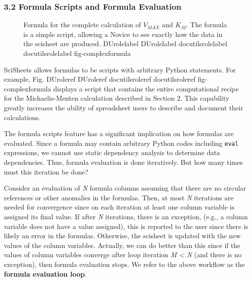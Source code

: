 \documentclass[letterpaper,compsoc,twoside]{IEEEtran}
\providecommand*{\DUrole}[2]{%
  \ifcsname DUrole#1\endcsname%
    \csname DUrole#1\endcsname{#2}%
  \else%
    \ifcsname docutilsrole#1\endcsname%
      \csname docutilsrole#1\endcsname{#2}%
    \else%
      #2%
    \fi%
  \fi%
}
\begin{document}
\subsubsection{3.2 Formula Scripts and Formula Evaluation%
  \label{formula-scripts-and-formula-evaluation}%
}
\begin{figure}[]\noindent{}
\caption{Formula for the complete calculation of $V_{MAX}$ and
$K_M$.
The formula is a simple script, allowing a Novice to see
exactly how the data in the scisheet are produced.
\DUrole{label}{fig-complexformula}}
\end{figure}

SciSheets allows formulas to be scripts with arbitrary Python statements.
For example, Fig. \DUrole{ref}{fig-complexformula} displays a script that contains
the entire computational recipe for the Michaelis-Menten calculation
described in Section 2.
This capability greatly increases the ability of spreadsheet users
to describe and document their calculations.

The formula scripts feature has a significant implication
on how formulas are evaluated.
Since a formula may contain arbitrary Python codes including
\texttt{eval} expressions, we cannot use static dependency analysis
to determine data dependencies.
Thus, formula evaluation is done iteratively.
But how many times must this iteration be done?

Consider an evaluation of \emph{N} formula columns assuming that
there are no
circular references or other anomalies in the formulas.
Then, at most \emph{N} iterations are needed for convergence since on each iteration
at least one column variable is assigned its final value.
If after \emph{N} iterations, there is an exception, (e.g., a column variable
does not have a value assigned), this is reported to the user since there is
likely an error in the formulas.
Otherwise, the scisheet is updated with the new values of the
column variables.
Actually, we can do better than this since
if the values of column variables converge after loop iteration
\emph{M < N} (and there is no exception), then
formula evaluation stops.
We refer to the above workflow as the \textbf{formula evaluation loop}.
\end{document}
